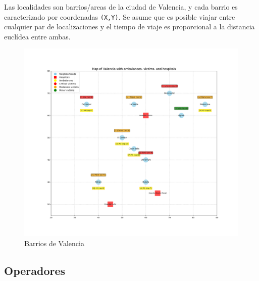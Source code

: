 Las localidades son barrios/areas de la ciudad de Valencia, y cada barrio es caracterizado por coordenadas \lstinline|(X,Y)|.
Se asume que es posible viajar entre cualquier par de localizaciones y el tiempo de viaje es proporcional a la distancia euclídea entre ambas.
\begin{figure}[htbp]
   \centering
   \includegraphics{images/valencia_map.png}
   \caption{Barrios de Valencia}
   \label{fig:valencia_map}
\end{figure}

\subsection{Operadores}

